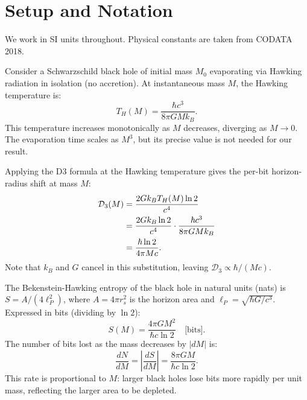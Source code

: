 \documentclass[aps,prd,twocolumn,showpacs,preprintnumbers,amsmath,amssymb,longbibliography]{revtex4-2}
\begin{document}
\section{Setup and Notation}
\label{sec:setup}

We work in SI units throughout. Physical constants are taken from CODATA 2018.

Consider a Schwarzschild black hole of initial mass $M_0$ evaporating via Hawking radiation 
in isolation (no accretion). At instantaneous mass $M$, the Hawking temperature is:
\begin{equation}
T_H(M) = \frac{\hbar c^3}{8\pi G M k_B}.
\label{eq:hawking_temp}
\end{equation}
This temperature increases monotonically as $M$ decreases, diverging as $M \to 0$. 
The evaporation time scales as $M^3$, but its precise value is not needed for our result.

Applying the D3 formula at the Hawking temperature gives the per-bit horizon-radius 
shift at mass $M$:
\begin{align}
\mathcal{D}_3(M) &= \frac{2G k_B T_H(M) \ln 2}{c^4} \notag \\
&= \frac{2G k_B \ln 2}{c^4} \cdot \frac{\hbar c^3}{8\pi G M k_B} \notag \\
&= \frac{\hbar \ln 2}{4\pi M c}.
\label{eq:d3_M}
\end{align}
Note that $k_B$ and $G$ cancel in this substitution, leaving $\mathcal{D}_3 \propto \hbar/(Mc)$.

The Bekenstein-Hawking entropy of the black hole in natural units (nats) is 
$S = A/(4\ell_P^2)$, where $A = 4\pi r_s^2$ is the horizon area and 
$\ell_P = \sqrt{\hbar G/c^3}$. Expressed in bits (dividing by $\ln 2$):
\begin{equation}
S(M) = \frac{4\pi G M^2}{\hbar c \ln 2} \quad \text{[bits]}.
\label{eq:entropy}
\end{equation}
The number of bits lost as the mass decreases by $|dM|$ is:
\begin{equation}
\frac{dN}{dM} = \left|\frac{dS}{dM}\right| = \frac{8\pi G M}{\hbar c \ln 2}.
\label{eq:bitloss}
\end{equation}
This rate is proportional to $M$: larger black holes lose bits more rapidly per unit mass, 
reflecting the larger area to be depleted.

\end{document}
